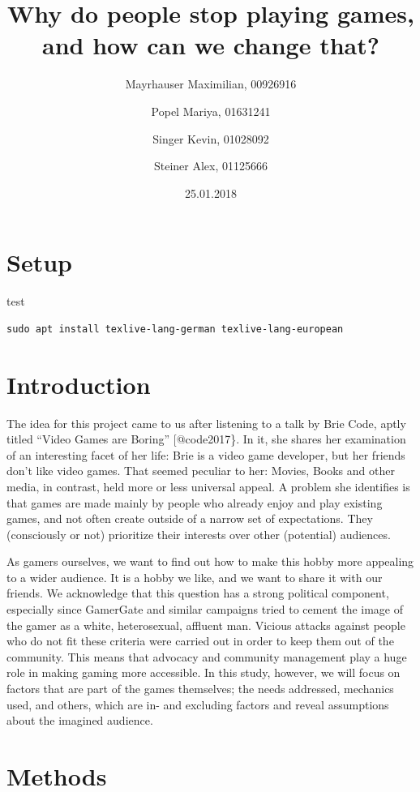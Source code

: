 \documentclass[]{vutinfth}
\title{Why do people stop playing games, and how can we change that?}
\author{Mayrhauser Maximilian, 00926916 \and Popel Mariya, 01631241 \and Singer Kevin, 01028092 \and Steiner Alex, 01125666}
\date{25.01.2018}
\begin{document}
\maketitle

\hypertarget{setup}{%
\chapter{Setup}\label{setup}}

test

\begin{verbatim}
sudo apt install texlive-lang-german texlive-lang-european
\end{verbatim}

\hypertarget{introduction}{%
\chapter{Introduction}\label{introduction}}

The idea for this project came to us after listening to a talk by Brie
Code, aptly titled ``Video Games are Boring'' {[}@code2017\}. In it, she
shares her examination of an interesting facet of her life: Brie is a
video game developer, but her friends don't like video games. That
seemed peculiar to her: Movies, Books and other media, in contrast, held
more or less universal appeal. A problem she identifies is that games
are made mainly by people who already enjoy and play existing games, and
not often create outside of a narrow set of expectations. They
(consciously or not) prioritize their interests over other (potential)
audiences.

As gamers ourselves, we want to find out how to make this hobby more
appealing to a wider audience. It is a hobby we like, and we want to
share it with our friends. We acknowledge that this question has a
strong political component, especially since GamerGate and similar
campaigns tried to cement the image of the gamer as a white,
heterosexual, affluent man. Vicious attacks against people who do not
fit these criteria were carried out in order to keep them out of the
community. This means that advocacy and community management play a huge
role in making gaming more accessible. In this study, however, we will
focus on factors that are part of the games themselves; the needs
addressed, mechanics used, and others, which are in- and excluding
factors and reveal assumptions about the imagined audience.

\hypertarget{methods}{%
\chapter{\texorpdfstring{\textbf{Methods}}{Methods}}\label{methods}}
\end{document}
